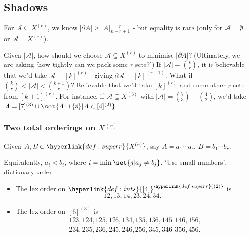 \documentclass{article}
\let\subset\subseteq
\begin{document}
\subsection{Shadows}
For $\mathcal{A} \subset X^{(r)}$, we know $|\partial A| \geq |A| \frac{r}{n-r+1}$ - but equality is rare (only for $\mathcal{A} = \emptyset$ or $\mathcal{A} = X^{(r)}$).

Given $|\mathcal{A}|$, how should we choose $\mathcal{A} \subset X^{(r)}$ to minimise $|\partial A|$?
(Ultimately, we are asking `how tightly can we pack some $r$-sets?')
If $|\mathcal{A}| = \binom{k}{r}$, it is believable that we'd take $\mathcal{A} = [k]^{(r)}$ - giving $\partial \mathcal{A} = [k]^{(r-1)}$.
What if $\binom{k}{r} < |\mathcal{A}| < \binom{k+1}{r}$? Believable that we'd take $[k]^{(r)}$ and some other $r$-sets from $[k+1]^{(r)}$.
For instance, if $\mathcal{A} \subset X^{(3)}$ with $|\mathcal{A}| = \binom{7}{3} + \binom{4}{2}$, we'd take $\mathcal{A} = [7]^{(3)} \cup \set{A \cup \{8\} | A\in [4]^{(2)}}$

\subsubsection{Two total orderings on \texorpdfstring{$X^{(r)}$}{X(r)}}
Given $A,B \in \hyperlink{def:superr}{X^{(r)}}$, say $A = a_1 \dotsb a_r$, $B = b_1 \dotsb b_r$.
Equivalently, $a_i < b_i$, where $i = \min\set{j | a_j \neq b_j}$.
`Use small numbers', dictionary order.

\begin{eg}\leavevmode
  \begin{itemize}
    \item The \hyperlink{def:lex}{lex order} on $\hyperlink{def:ints}{[4]}^{\hyperlink{def:superr}{(2)}}$ is
      \begin{equation*}
        12,13,14,23,24,34.
      \end{equation*}
    \item The lex order on $[6]^{(3)}$ is
      \begin{align*}
        &123,124,125,126,134,135,136,145,146,156,\\
        &234,235,236,245,246,256,345,346,356,456.
      \end{align*}
  \end{itemize}
\end{eg}
\end{document}
